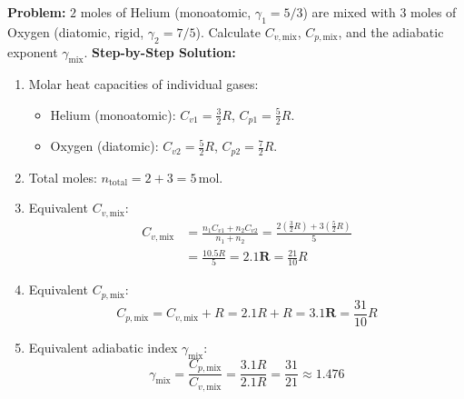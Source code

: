 \documentclass[10pt,twoside,openright]{book}
\begin{document}
\begin{usecasebox}
\textbf{Problem:} $2$ moles of Helium (monoatomic, $\gamma_1 = 5/3$) are mixed with $3$ moles of Oxygen (diatomic, rigid, $\gamma_2 = 7/5$). Calculate $C_{v,\text{mix}}$, $C_{p,\text{mix}}$, and the adiabatic exponent $\gamma_{\text{mix}}$.
\textbf{Step-by-Step Solution:}
\begin{enumerate}
  \item Molar heat capacities of individual gases:
  \begin{itemize}
    \item Helium (monoatomic): $C_{v1} = \frac{3}{2}R$, $C_{p1} = \frac{5}{2}R$.
    \item Oxygen (diatomic): $C_{v2} = \frac{5}{2}R$, $C_{p2} = \frac{7}{2}R$.
  \end{itemize}
  \item Total moles: $n_{\text{total}} = 2 + 3 = 5\,\mathrm{mol}$.
  \item Equivalent $C_{v,\text{mix}}$:
  \begin{align}
    C_{v,\text{mix}} &= \frac{n_1 C_{v1} + n_2 C_{v2}}{n_1 + n_2} = \frac{2 \left(\frac{3}{2}R\right) + 3 \left(\frac{5}{2}R\right)}{5} \\
    &= \frac{10.5R}{5} = \mathbf{2.1 R} = \frac{21}{10}R
  \end{align}
  \item Equivalent $C_{p,\text{mix}}$:
  \begin{equation}
    C_{p,\text{mix}} = C_{v,\text{mix}} + R = 2.1 R + R = \mathbf{3.1 R} = \frac{31}{10}R
  \end{equation}
  \item Equivalent adiabatic index $\gamma_{\text{mix}}$:
  \begin{equation}
    \gamma_{\text{mix}} = \frac{C_{p,\text{mix}}}{C_{v,\text{mix}}} = \frac{3.1 R}{2.1 R} = \frac{31}{21} \approx \mathbf{1.476}
  \end{equation}
\end{enumerate}
\end{usecasebox}
\end{document}
